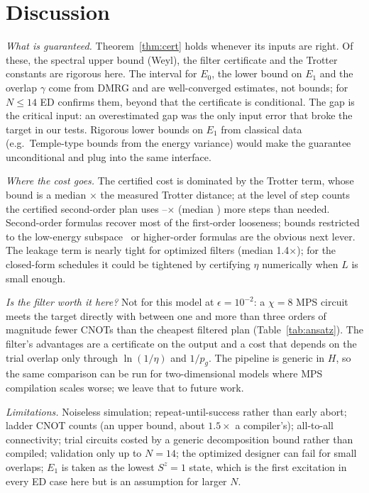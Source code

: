 \documentclass[aps,pra,twocolumn,superscriptaddress,nofootinbib]{revtex4-2}
\begin{document}
\section{Discussion}

\emph{What is guaranteed.} Theorem~\ref{thm:cert} holds whenever its inputs are right. Of these, the
spectral upper bound (Weyl), the filter certificate and the Trotter constants are rigorous here. The
interval for $E_0$, the lower bound on $E_1$ and the overlap $\gamma$ come from DMRG and are
well-converged estimates, not bounds; for $N\le14$ ED confirms them, beyond that the certificate is
conditional. The gap is the critical input: an overestimated gap was the only input error that
broke the target in our tests. Rigorous lower bounds on $E_1$ from classical data
(e.g.\ Temple-type bounds from the energy variance) would make the guarantee unconditional and plug
into the same interface.

\emph{Where the cost goes.} The certified cost is dominated by the Trotter term, whose bound is a
median \trotRatioMed$\times$ the measured Trotter distance; at the level of step counts the certified
second-order plan uses \oracleMin--\oracleMax$\times$ (median \oracleMed) more steps than needed. Second-order formulas recover most of the first-order looseness;
bounds restricted to the low-energy subspace~\cite{Sahinoglu2021} or higher-order formulas are the
obvious next lever. The leakage term is nearly tight for optimized filters (median 1.4$\times$); for the closed-form
schedules it could be tightened by certifying $\eta$ numerically when $L$ is small enough.

\emph{Is the filter worth it here?} Not for this model at $\epsilon=10^{-2}$: a $\chi=8$ MPS circuit
meets the target directly with between one and more than three orders of magnitude fewer CNOTs than
the cheapest filtered plan (Table~\ref{tab:ansatz}).
The filter's advantages are a certificate on the output and a cost that depends on the trial overlap
only through $\ln(1/\eta)$ and $1/p_g$. The pipeline is generic
in $H$, so the same comparison can be run for two-dimensional models where MPS compilation scales
worse; we leave that to future work.

\emph{Limitations.} Noiseless simulation; repeat-until-success rather than early abort; ladder CNOT
counts (an upper bound, about $1.5\times$ a compiler's); all-to-all connectivity; trial circuits costed
by a generic decomposition bound rather than compiled; validation only up to $N=14$; the optimized
designer can fail for small overlaps; $E_1$ is taken as the lowest $S^z=1$ state, which is the first
excitation in every ED case here but is an assumption for larger $N$.
\end{document}
